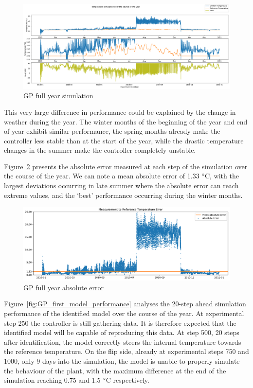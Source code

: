 \begin{figure}[ht]
    \centering
    \includegraphics[width =
    \textwidth]{Plots/4_GP_480pts_12_averageYear_fullyear.pdf}
    \caption{GP full year simulation}
    \label{fig:GP_fullyear_simulation}
\end{figure}

This very large difference in performance could be explained by the change in
weather during the year. The winter months of the beginning of the year and end
of year exhibit similar performance, the spring months already make the
controller less stable than at the start of the year, while the drastic
temperature changes in the summer make the controller completely unstable.

\clearpage


Figure~\ref{fig:GP_fullyear_abserr} presents the absolute error measured at each
step of the simulation over the course of the year. We can note a mean absolute
error of 1.33 $\degree$C, with the largest deviations occurring in late summer
where the absolute error can reach extreme values, and the `best' performance
occurring during the winter months. 

\begin{figure}[ht]
    \centering
    \includegraphics[width =
    \textwidth]{Plots/4_GP_480pts_12_averageYear_abserr.pdf}
    \caption{GP full year absolute error}
    \label{fig:GP_fullyear_abserr}
\end{figure}

Figure~\ref{fig:GP_first_model_performance} analyses the 20-step ahead
simulation performance of the identified model over the course of the year. At
experimental step 250 the controller is still gathering data. It is therefore
expected that the identified model will be capable of reproducing this data. At
step 500, 20 steps after identification, the model correctly steers the internal
temperature towards the reference temperature. On the flip side, already at
experimental steps 750 and 1000, only 9 days into the simulation, the model is
unable to properly simulate the behaviour of the plant, with the maximum
difference at the end of the simulation reaching 0.75 and 1.5 $\degree$C
respectively.

